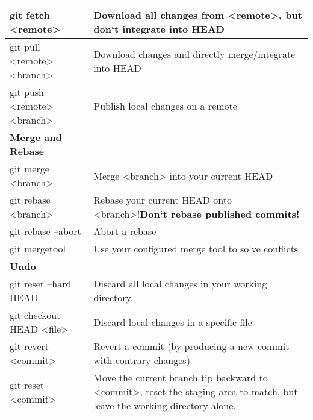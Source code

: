 \begin{longtable}{| p{} | p{} |}
    git fetch <remote>&  
    Download all changes from <remote>,
    but don‘t integrate into HEAD
    \\ \hline
    
    git pull <remote> <branch>&
    Download changes and directly merge/integrate into HEAD  
    \\ \hline 
    
    git push <remote> <branch>&
    Publish local changes on a remote
    \\ \hline \hline
       
   \textbf{ Merge and Rebase}&
    \\\hline 
    
    \hline
    git merge <branch>&
    Merge <branch> into your current HEAD
    \\ \hline 
    
    git rebase <branch>& 
    Rebase your current HEAD onto <branch>!\textbf{Don‘t rebase published commits!}
    \\ \hline 
    
    git rebase --abort&
    Abort a rebase
    \\ \hline 
    
    git mergetool& 
    Use your configured merge tool to solve conflicts
    \\ \hline \hline
   
    \textbf{Undo}&
    \\\hline 

    \hline
    git reset --hard HEAD&
    Discard all local changes in your working directory.
    \\ \hline  
    
    git checkout HEAD <file>&
    Discard local changes in a specific file
    \\ \hline   
    
    git revert <commit>&
    Revert a commit (by producing a new commit with contrary changes)
    \\ \hline    
    
    git reset <commit>&
    Move the current branch tip backward to <commit>, reset the staging area to match, but leave the working directory alone. 
    \\ \hline
\end{longtable}

